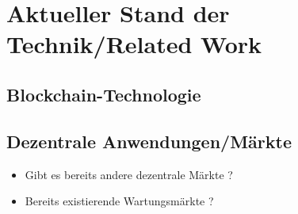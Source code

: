 \chapter{Aktueller Stand der Technik/Related Work}
\label{cha:stand-technik}






\section{Blockchain-Technologie}


\section{Dezentrale Anwendungen/Märkte}


\begin{itemize}
    \item Gibt es bereits andere dezentrale Märkte ?
    \item Bereits existierende Wartungsmärkte ?
\end{itemize}


